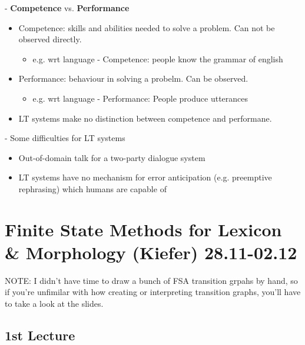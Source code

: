 \documentclass[11pt]{article}
\newenvironment{itemise}{
\begin{itemize}
  \setlength{\itemsep}{1pt}
  \setlength{\parskip}{0pt}
  \setlength{\parsep}{0pt}
}{\end{itemize}}
\begin{document}
- {\bf Competence} vs. {\bf Performance}
\begin{itemise}
 \item Competence: skills and abilities needed to solve a problem. Can not be observed directly.
\begin{itemise}
 \item e.g. wrt language - Competence: people know the grammar of english
\end{itemise}
 \item Performance: behaviour in solving a probelm. Can be observed.
\begin{itemise}
 \item e.g. wrt language - Performance: People produce utterances
\end{itemise}
 \item LT systems make no distinction between competence and performane.
\end{itemise}
- Some difficulties for LT systems
\begin{itemise}
 \item Out-of-domain talk for a two-party dialogue system
 \item LT systems have no mechanism for error anticipation (e.g. preemptive rephrasing) which humans are capable of
\end{itemise}

\newpage\section{Finite State Methods for Lexicon \& Morphology (Kiefer) 28.11-02.12}
NOTE: I didn't have time to draw a bunch of FSA transition grpahs by hand, so if you're unfimilar with how creating or interpreting transition graphs, you'll have to take a look at the slides.

\subsection{ 1st Lecture }
\end{document}
